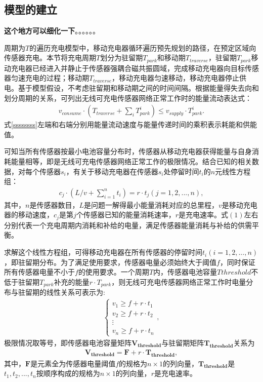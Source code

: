 \documentclass{whutmod}
\begin{document}
		\subsection{模型的建立}
			\textbf{这个地方可以细化一下}。。。。。。
			
			周期为$T$的遍历充电模型中，移动充电器循环遍历预先规划的路径，在预定区域向传感器充电。本节将充电周期$T$划分为驻留期$T_{park}$和移动期$T_{traverse}$，驻留期$T_{park}$移动充电器已经进入并静止于传感器强耦合磁共振圆域，完成移动充电器向目标传感器匀速充电的过程；移动期$T_{traverse}$，移动充电器匀速移动，移动充电器停止供电。基于模型假设，不考虑驻留期和移动期之间的时间间隔。根据能量得失去向和划分周期的关系，可列出无线可充电传感器网络正常工作时的能量流动表达式：
			\begin{gather}\label{ssssssss}
			v_{consume}\cdot (T_{traverse}+\sum_{i} T_{park}^i)\leq v_{supply}\cdot T_{park}^i.
			\end{gather}
			式\ref{ssssssss}左端和右端分别用能量流动速度与能量传递时间的乘积表示耗能和供能值。
			
			可知当所有传感器按最小电池容量分布时，传感器从移动充电器获得能量与自身消耗能量相等，即是无线可充电传感器网络正常工作的极限情况。结合已知的相关数据，对每个传感器$s_i$，有关于移动充电器在传感器$s_i$处停留时间$t_i$的$n$元线性方程组：
			\begin{gather}
			c_{j} \cdot (L/v+\sum_{i=1}^{n}t_i)=r \cdot t_j (j=1,2,...,n),
			\end{gather}
			其中，$n$是传感器数目，$L$是问题一解得最小能量消耗对应的总里程，$v$是移动充电器的移动速度，$c_{j}$是第$j$个传感器已知的能量消耗速率，$r$是充电速率。式$(1)$左右分别代表一个充电周期内消耗和补给的电量，满足传感器能量消耗与补给的供需平衡。
			
			求解这个线性方程组，可得移动充电器在所有传感器的停留时间$t_i(i=1,2,...,n)$，即驻留期分布。为了满足使用要求，传感器电量必须始终大于阈值$f$，同时保证所有传感器电量不小于$f$的使用要求。一个周期$T$内，传感器电池容量$T{threshold}$不低于驻留期$T_{park}$补充的能量$r \cdot T_{park}$，则无线可充电传感器网络正常工作时电量分布与驻留期的线性关系可表示为:
			\begin{gather}
			\left\{\begin{matrix}
			v_1\geq f+r\cdot t_1\\ 
			v_2\geq f+r\cdot t_2\\ 
			\vdots \\ 
			v_n \geq f+r\cdot t_n
			\end{matrix}\right.,
			\end{gather}
			极限情况取等号，即传感器电池容量矩阵$\bm {V_{threshold}}$与驻留期矩阵$\bm {T_{threshold}}$关系为
			\begin{gather}
			\bm{V_{threshold}}=\bm{F}+r\cdot \bm{T_{threshold}},
			\end{gather}
			其中，$\bm F$是元素全为传感器电量阈值$f$的规格为$n \times 1$的列向量，$\bm{T_{threshold}}$是$t_1,t_2,...,t_{n}$按顺序构成的规格为$n\times 1$的列向量，$r$是充电速率。
    		
\end{document}
